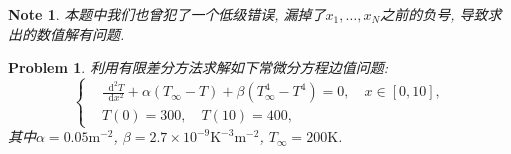 \documentclass[a4paper, 12pt]{ctexart}
\theoremstyle{plain}
\newtheorem{problem}{Problem}[section]
\theoremstyle{plain}
\theoremstyle{plain}
\newtheorem{note}{Note}[section]
\theoremstyle{nonumberplain}
\newcommand*{\diff}{\mathop{}\!\mathrm{d}}
\begin{document}
    \begin{note}
        本题中我们也曾犯了一个低级错误, 漏掉了$x_{1},\dotsc,x_{N}$之前的负号, 导致求出的数值解有问题.
    \end{note}

    \begin{problem}
        \label{problem: 3}
        利用有限差分方法求解如下常微分方程边值问题:
        \begin{equation}
            \left\{
            \begin{aligned}
                &\frac{\diff^{2}T}{\diff x^{2}}+\alpha(T_{\infty}-T)+\beta(T_{\infty}^{4}-T^{4})=0,\quad x\in [0, 10],\\
                &T(0)=300,\quad T(10)=400,
            \end{aligned}
            \right.
        \end{equation}
        其中$\alpha=0.05\mathrm{m}^{-2}$, $\beta=2.7\times 10^{-9}\mathrm{K}^{-3}\mathrm{m}^{-2}$, $T_{\infty}=200\mathrm{K}$.
    \end{problem}
\end{document}
